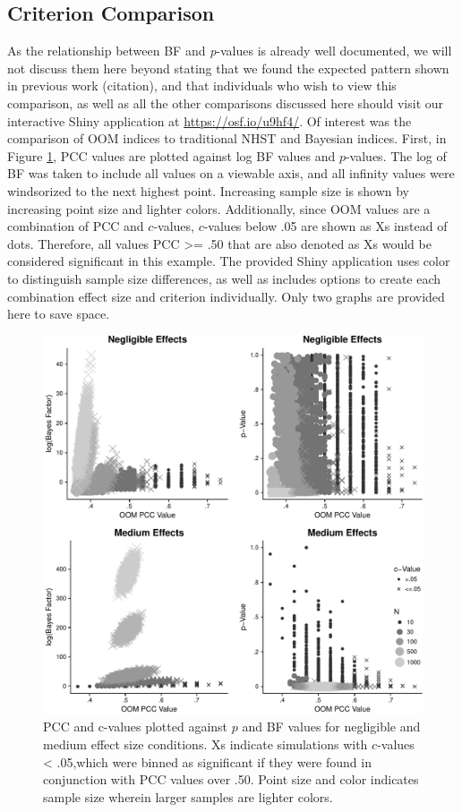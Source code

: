 \documentclass[english,man]{apa6}
\theoremstyle{definition}
\theoremstyle{definition}
\theoremstyle{definition}
\theoremstyle{remark}
\begin{document}
\subsection{Criterion Comparison}\label{criterion-comparison}

As the relationship between BF and \emph{p}-values is already well
documented, we will not discuss them here beyond stating that we found
the expected pattern shown in previous work (citation), and that
individuals who wish to view this comparison, as well as all the other
comparisons discussed here should visit our interactive Shiny
application at \url{https://osf.io/u9hf4/}. Of interest was the
comparison of OOM indices to traditional NHST and Bayesian indices.
First, in Figure \ref{fig:pcc-bf-fig}, PCC values are plotted against
log BF values and \(p\)-values. The log of BF was taken to include all
values on a viewable axis, and all infinity values were windsorized to
the next highest point. Increasing sample size is shown by increasing
point size and lighter colors. Additionally, since OOM values are a
combination of PCC and \(c\)-values, \(c\)-values below .05 are shown as
Xs instead of dots. Therefore, all values PCC \textgreater{}= .50 that
are also denoted as Xs would be considered significant in this example.
The provided Shiny application uses color to distinguish sample size
differences, as well as includes options to create each combination
effect size and criterion individually. Only two graphs are provided
here to save space.

\begin{figure}
\centering
\includegraphics{alt_nhst_V2.kv.1.10_files/figure-latex/pcc-bf-fig-1.pdf}
\caption{\label{fig:pcc-bf-fig}PCC and c-values plotted against \(p\) and BF
values for negligible and medium effect size conditions. Xs indicate
simulations with \(c\)-values \textless{} .05,which were binned as
significant if they were found in conjunction with PCC values over .50.
Point size and color indicates sample size wherein larger samples are
lighter colors.}
\end{figure}
\end{document}
